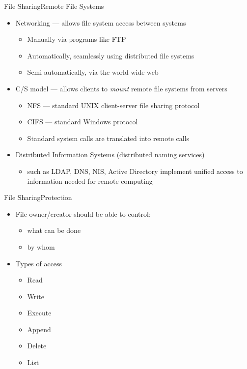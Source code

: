 \begin{frame}{File Sharing}{Remote File Systems}
  \begin{itemize}
  \item[] Networking --- allows file system access between systems
    \begin{itemize}
    \item Manually via programs like FTP
    \item Automatically, seamlessly using distributed file systems
    \item Semi automatically, via the world wide web
    \end{itemize}
  \item[] C/S model --- allows clients to \emph{mount} remote file
      systems from servers
    \begin{itemize}
    \item NFS --- standard UNIX client-server file sharing protocol
    \item CIFS --- standard Windows protocol
    \item Standard system calls are translated into remote calls
    \end{itemize}
  \item[] Distributed Information Systems (distributed naming services)
    \begin{itemize}
    \item such as LDAP, DNS, NIS, Active Directory implement unified access to information
      needed for remote computing
    \end{itemize}
  \end{itemize}
\end{frame}

\begin{frame}{File Sharing}{Protection}
  \begin{itemize}
  \item File owner/creator should be able to control:
    \begin{itemize}
    \item what can be done
    \item by whom
    \end{itemize}
  \item Types of access
    \begin{itemize}
    \item Read
    \item Write
    \item Execute
    \item Append
    \item Delete
    \item List
    \end{itemize}
  \end{itemize}
\end{frame}

